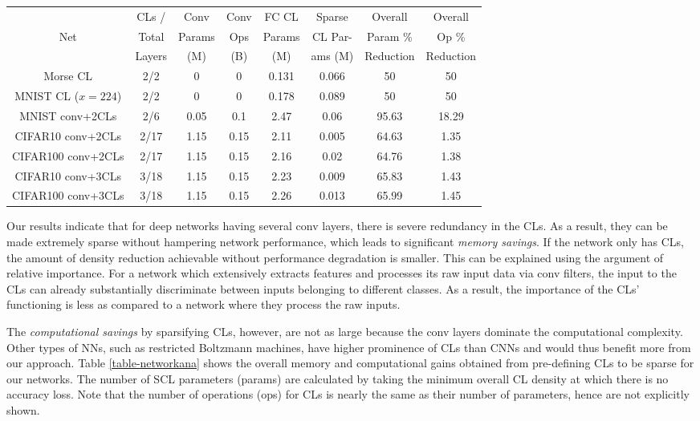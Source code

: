\documentclass[conference]{IEEEtran}
\begin{document}
\begin{table*}[!t]
\caption{Savings in some of our NN architectures due to pre-defined sparsity}
\label{table-networkana}
\centering
\begin{tabular}{|c|c|c|c|c|c|c|c|}
\hline
    & CLs /  & Conv   & Conv & FC CL  & Sparse  & Overall   & Overall  \\
Net & Total  & Params & Ops  & Params & CL Par- & Param \%  & Op \%    \\
    & Layers & (M)    & (B)  & (M)    & ams (M) & Reduction & Reduction \\
\hline
\hline
Morse CL  & 2/2 & 0 & 0 & 0.131 & 0.066 & 50 & 50 \\
\hline
MNIST CL ($x=224$) & 2/2 & 0 & 0 & 0.178 & 0.089 & 50 & 50 \\
\hline
MNIST conv+2CLs & 2/6 & 0.05 & 0.1 & 2.47 & 0.06 & 95.63 & 18.29 \\
\hline
CIFAR10 conv+2CLs & 2/17 & 1.15 & 0.15 & 2.11 & 0.005 & 64.63 & 1.35 \\
\hline
CIFAR100 conv+2CLs & 2/17 & 1.15 & 0.15 & 2.16 & 0.02 & 64.76 & 1.38 \\
\hline
CIFAR10 conv+3CLs & 3/18 & 1.15 & 0.15 & 2.23 & 0.009 & 65.83 & 1.43 \\
\hline
CIFAR100 conv+3CLs & 3/18 & 1.15 & 0.15 & 2.26 & 0.013 & 65.99 & 1.45 \\
\hline
\end{tabular}
\end{table*}

Our results indicate that for deep networks having several conv %
layers, there is severe redundancy in the CLs. As a result, they can be made extremely sparse without hampering network performance, which leads to significant \emph{memory savings}. If the network only has CLs, the amount of density reduction achievable without performance degradation is smaller. This can be explained using the argument of relative importance. For a network which extensively extracts features and processes its raw input data via conv filters, the input to the CLs can already substantially discriminate between inputs belonging to different classes. As a result, the importance of the CLs' functioning is less as compared to a network where they process the raw inputs. 

The \emph{computational savings} by sparsifying CLs, however, are not as large because the conv layers dominate the computational complexity. %
Other types of NNs, such as restricted Boltzmann machines, %
have higher prominence of CLs than CNNs and would thus benefit more from our approach. Table \ref{table-networkana} shows the overall memory and computational gains obtained from pre-defining CLs to be sparse for our networks. The number of SCL parameters (params) are calculated by taking the minimum overall CL density at which there is no accuracy loss. Note that the number of operations (ops) for CLs is nearly the same as their number of parameters, hence are not explicitly shown. %
\end{document}
